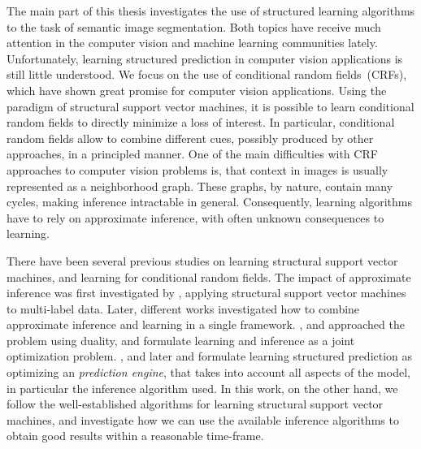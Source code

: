 The main part of this thesis investigates the use of structured learning
algorithms to the task of semantic image segmentation. Both topics have receive
much attention in the computer vision and machine learning communities lately.
Unfortunately, learning structured prediction in computer vision applications
is still little understood.
We focus on the use of conditional random fields~(CRFs), which have shown
great promise for computer vision applications. Using the paradigm of
structural support vector machines, it is possible to learn conditional random
fields to directly minimize a loss of interest. In particular, conditional
random fields allow to combine different cues, possibly produced by other
approaches, in a principled manner. One of the main difficulties with CRF
approaches to computer vision problems is, that context in images is usually
represented as a neighborhood graph.  These graphs, by nature, contain many
cycles, making inference intractable in general. Consequently, learning algorithms
have to rely on approximate inference, with often unknown consequences to learning.

There have been several previous studies on learning structural support vector machines,
and learning for conditional random fields. The impact of approximate inference was first
investigated by \citet{finley2008training}, applying structural support vector machines
to multi-label data. Later, different works investigated how to combine approximate inference and
learning in a single framework. \citet{meshi2010learning, komodakis2011efficient}, and \citet{hazan2010primal} approached
the problem using duality, and formulate learning and inference as a joint optimization problem.
\citet{stoyanov2011empirical}, and later \citet{jancsarylearning} and  \citet{krahenbuhlparameter} formulate learning
structured prediction as optimizing an \emph{prediction engine}, that takes into account all aspects
of the model, in particular the inference algorithm used.
In this work, on the other hand, we follow the well-established algorithms for learning structural
support vector machines, and investigate how we can use the available inference algorithms to
obtain good results within a reasonable time-frame.

